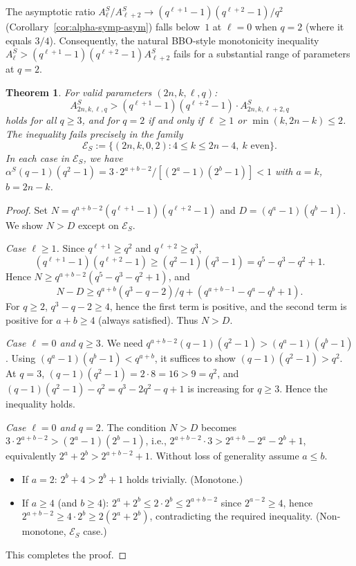 \documentclass[10pt,a4paper]{amsart}
\newtheorem{theorem}{Theorem}
\begin{document}
\medskip
The asymptotic ratio
$A^S_\ell / A^S_{\ell+2} \to (q^{\ell+1}-1)(q^{\ell+2}-1)/q^2$
(Corollary~\ref{cor:alpha-symp-asym}) falls below~$1$ at $\ell = 0$ when
$q = 2$ (where it equals $3/4$). Consequently, the natural BBO-style
monotonicity inequality $A^S_{\ell} > (q^{\ell+1}-1)(q^{\ell+2}-1) A^S_{\ell+2}$
fails for a substantial range of parameters at $q = 2$.

\begin{theorem}\label{thm:exception-symp}
For valid parameters $(2n, k, \ell, q)$:
\[
  A^S_{2n,k,\ell,q} > (q^{\ell+1}-1)(q^{\ell+2}-1) \cdot A^S_{2n,k,\ell+2,q}
\]
holds for \emph{all} $q \geq 3$, and for $q = 2$ if and only if $\ell \geq 1$
or $\min(k, 2n-k) \leq 2$.
The inequality fails precisely in the family
\[
  \mathcal{E}_S := \{(2n, k, 0, 2) : 4 \leq k \leq 2n-4,\ k \text{ even}\}.
\]
In each case in $\mathcal{E}_S$, we have $\alpha^S(q-1)(q^2-1) = 3 \cdot 2^{a+b-2}/[(2^a-1)(2^b-1)] < 1$
with $a = k$, $b = 2n - k$.
\end{theorem}

\begin{proof}
Set $N = q^{a+b-2}(q^{\ell+1}-1)(q^{\ell+2}-1)$ and $D = (q^a-1)(q^b-1)$.
We show $N > D$ except on $\mathcal{E}_S$.

\emph{Case $\ell \geq 1$.} Since $q^{\ell+1} \geq q^2$ and $q^{\ell+2} \geq q^3$,
\[
  (q^{\ell+1}-1)(q^{\ell+2}-1) \geq (q^2-1)(q^3-1) = q^5 - q^3 - q^2 + 1.
\]
Hence $N \geq q^{a+b-2}(q^5 - q^3 - q^2 + 1)$, and
\[
  N - D \geq q^{a+b}(q^3 - q - 2)/q + (q^{a+b-1} - q^a - q^b + 1).
\]
For $q \geq 2$, $q^3 - q - 2 \geq 4$, hence the first term is positive,
and the second term is positive for $a + b \geq 4$ (always satisfied).
Thus $N > D$.

\emph{Case $\ell = 0$ and $q \geq 3$.}
We need $q^{a+b-2}(q-1)(q^2-1) > (q^a-1)(q^b-1)$.
Using $(q^a-1)(q^b-1) < q^{a+b}$,
it suffices to show $(q-1)(q^2-1) > q^2$.
At $q = 3$, $(q-1)(q^2-1) = 2 \cdot 8 = 16 > 9 = q^2$,
and $(q-1)(q^2-1) - q^2 = q^3 - 2q^2 - q + 1$ is increasing for $q \geq 3$.
Hence the inequality holds.

\emph{Case $\ell = 0$ and $q = 2$.} The condition $N > D$ becomes
$3 \cdot 2^{a+b-2} > (2^a-1)(2^b-1)$, i.e.,
$2^{a+b-2} \cdot 3 > 2^{a+b} - 2^a - 2^b + 1$, equivalently
$2^a + 2^b > 2^{a+b-2} + 1$.
Without loss of generality assume $a \leq b$.
\begin{itemize}
\item If $a = 2$: $2^b + 4 > 2^b + 1$ holds trivially. (Monotone.)
\item If $a \geq 4$ (and $b \geq 4$): $2^a + 2^b \leq 2 \cdot 2^b \leq 2^{a+b-2}$ since $2^{a-2} \geq 4$, hence
$2^{a+b-2} \geq 4 \cdot 2^b \geq 2(2^a + 2^b)$, contradicting the required inequality.
(Non-monotone, $\mathcal{E}_S$ case.)
\end{itemize}
This completes the proof.
\end{proof}
\end{document}

